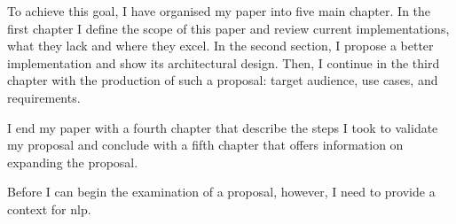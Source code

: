 To achieve this goal, I have organised my paper into five main chapter.
In the first chapter I define the scope of this paper and review current
implementations, what they lack and where they excel.
In the second section, I propose a better implementation and show its
architectural design. Then, I continue in the third chapter with the
production of such a proposal: target audience, use cases, and
requirements.

I end my paper with a fourth chapter that describe the steps I took to validate
my proposal and conclude with a fifth chapter that offers information on
expanding the proposal.

Before I can begin the examination of a proposal, however, I need to
provide a context for \gls{nlp}.

\endgroup

